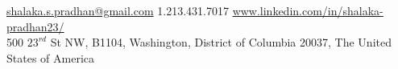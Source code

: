 \documentclass[10pt,a4paper]{article}
\begin{document}
\sloppy  %



\nobreakvspace{0.3em}  %

\noindent\href{mailto:shalaka.s.pradhan@gmail.com}{shalaka.s.pradhan\mbox{}@\mbox{}gmail.com}\sbull
\textsmaller{+}1.213.431.7017\sbull
\href{https://www.linkedin.com/in/shalaka-pradhan23/}{www.linkedin.com/in/shalaka-pradhan23/}
\\
500 $23^{rd}$ St NW, B1104, Washington, District of Columbia 20037, The United States of America 

\spacedhrule{0em}{-0.4em}  %
\end{document}
